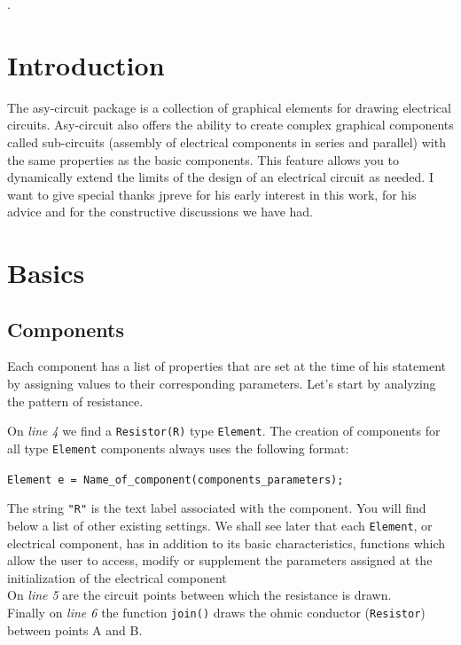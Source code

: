\documentclass[10pt]{article}
\begin{document}
\thispagestyle{empty}
.
\newpage
\ClearWallPaper
\tableofcontents
\newpage

\section{Introduction}
The asy-circuit package is a collection of graphical elements for drawing electrical circuits. Asy-circuit also offers the ability to create complex graphical components called sub-circuits (assembly of electrical components in series and parallel) with the same properties as the basic components. This feature allows you to dynamically extend the limits of the design of an electrical circuit as needed.
    I want to give special thanks jpreve for his early interest in this work, for his advice and for the constructive discussions we have had.
\section{Basics}
\subsection{Components}
{}

Each component has a list of properties that are set at the time of his statement by assigning values to their corresponding parameters. Let's start by analyzing the pattern of resistance.\par


On \emph{line 4} we find a \verb|Resistor(R)| type \verb|Element|. The creation of components for all type \verb|Element| components always uses the following format:\par

\begin{center}
\verb|Element e = Name_of_component(components_parameters);|
\end{center}
The string \verb|"R"| is the text label associated with the component. You will find below a list of other existing settings. We shall see later that each \verb|Element|, or electrical component, has in addition to its basic characteristics, functions which allow the user to access, modify or supplement the parameters assigned at the initialization of the electrical component\\
On \emph{line 5} are the circuit points between which the resistance is drawn.\\
Finally on \emph{line 6} the function \verb|join()| draws the ohmic conductor (\verb|Resistor|) between points A and B.
\end{document}
